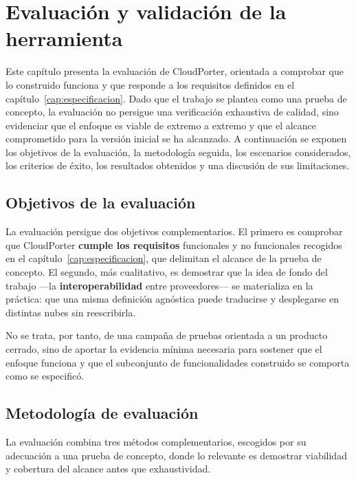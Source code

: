 \chapter{Evaluación y validación de la herramienta}\label{cap:evaluacion}

Este capítulo presenta la evaluación de CloudPorter, orientada a comprobar que lo construido
funciona y que responde a los requisitos definidos en el capítulo~\ref{cap:especificacion}. Dado
que el trabajo se plantea como una prueba de concepto, la evaluación no persigue una verificación
exhaustiva de calidad, sino evidenciar que el enfoque es viable de extremo a extremo y que el
alcance comprometido para la versión inicial se ha alcanzado. A continuación se exponen los
objetivos de la evaluación, la metodología seguida, los escenarios considerados, los criterios de
éxito, los resultados obtenidos y una discusión de sus limitaciones.

\section{Objetivos de la evaluación}

La evaluación persigue dos objetivos complementarios. El primero es comprobar que CloudPorter
\textbf{cumple los requisitos} funcionales y no funcionales recogidos en el
capítulo~\ref{cap:especificacion}, que delimitan el alcance de la prueba de concepto. El segundo,
más cualitativo, es demostrar que la idea de fondo del trabajo —la \textbf{interoperabilidad} entre
proveedores— se materializa en la práctica: que una misma definición agnóstica puede traducirse y
desplegarse en distintas nubes sin reescribirla.

No se trata, por tanto, de una campaña de pruebas orientada a un producto cerrado, sino de aportar
la evidencia mínima necesaria para sostener que el enfoque funciona y que el subconjunto de
funcionalidades construido se comporta como se especificó.

\section{Metodología de evaluación}

La evaluación combina tres métodos complementarios, escogidos por su adecuación a una prueba de
concepto, donde lo relevante es demostrar viabilidad y cobertura del alcance antes que exhaustividad.

